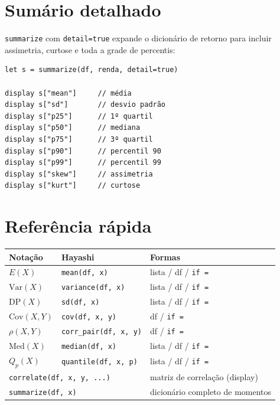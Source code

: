 \section{Sumário detalhado}

\lstinline{summarize} com \lstinline{detail=true} expande o dicionário de
retorno para incluir assimetria, curtose e toda a grade de percentis:

\begin{lstlisting}[caption={summarize com detail}]
let s = summarize(df, renda, detail=true)

display s["mean"]     // média
display s["sd"]       // desvio padrão
display s["p25"]      // 1º quartil
display s["p50"]      // mediana
display s["p75"]      // 3º quartil
display s["p90"]      // percentil 90
display s["p99"]      // percentil 99
display s["skew"]     // assimetria
display s["kurt"]     // curtose
\end{lstlisting}

\section{Referência rápida}

\begin{center}
\begin{tabular}{lll}
\toprule
\textbf{Notação} & \textbf{Hayashi} & \textbf{Formas} \\
\midrule
$E(X)$
  & \lstinline{mean(df, x)}
  & lista / df / \lstinline{if =} \\
$\mathrm{Var}(X)$
  & \lstinline{variance(df, x)}
  & lista / df / \lstinline{if =} \\
$\mathrm{DP}(X)$
  & \lstinline{sd(df, x)}
  & lista / df / \lstinline{if =} \\
$\mathrm{Cov}(X, Y)$
  & \lstinline{cov(df, x, y)}
  & df / \lstinline{if =} \\
$\rho(X, Y)$
  & \lstinline{corr_pair(df, x, y)}
  & df / \lstinline{if =} \\
$\mathrm{Med}(X)$
  & \lstinline{median(df, x)}
  & lista / df / \lstinline{if =} \\
$Q_p(X)$
  & \lstinline{quantile(df, x, p)}
  & lista / df / \lstinline{if =} \\
\midrule
\multicolumn{2}{l}{\lstinline{correlate(df, x, y, ...)}}
  & matriz de correlação (display) \\
\multicolumn{2}{l}{\lstinline{summarize(df, x)}}
  & dicionário completo de momentos \\
\bottomrule
\end{tabular}
\end{center}

